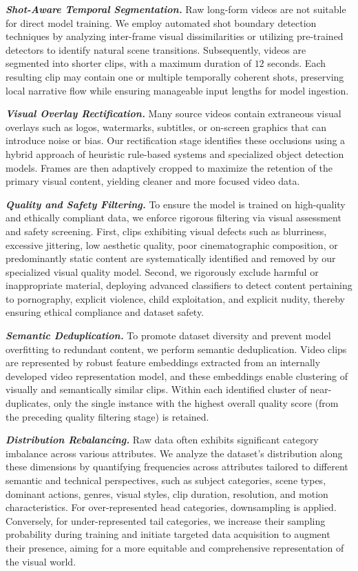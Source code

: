 \textbf{\textit{Shot-Aware Temporal Segmentation.}}  
Raw long-form videos are not suitable for direct model training. We employ automated shot boundary detection techniques by analyzing inter-frame visual dissimilarities or utilizing pre-trained detectors to identify natural scene transitions. Subsequently, videos are segmented into shorter clips, with a maximum duration of $12$ seconds. Each resulting clip may contain one or multiple temporally coherent shots, preserving local narrative flow while ensuring manageable input lengths for model ingestion.

\textbf{\textit{Visual Overlay Rectification.}}  
Many source videos contain extraneous visual overlays such as logos, watermarks, subtitles, or on-screen graphics that can introduce noise or bias. Our rectification stage identifies these occlusions using a hybrid approach of heuristic rule-based systems and specialized object detection models. Frames are then adaptively cropped to maximize the retention of the primary visual content, yielding cleaner and more focused video data.

\textbf{\textit{Quality and Safety Filtering.}}  
To ensure the model is trained on high-quality and ethically compliant data, we enforce rigorous filtering via visual assessment and safety screening. First, clips exhibiting visual defects such as blurriness, excessive jittering, low aesthetic quality, poor cinematographic composition, or predominantly static content are systematically identified and removed by our specialized visual quality model. 
Second, we rigorously exclude harmful or inappropriate material, deploying advanced classifiers to detect content pertaining to pornography, explicit violence, child exploitation, and explicit nudity, thereby ensuring ethical compliance and dataset safety.

\textbf{\textit{Semantic Deduplication.}}  
To promote dataset diversity and prevent model overfitting to redundant content, we perform semantic deduplication. Video clips are represented by robust feature embeddings extracted from an internally developed video representation model, and these embeddings enable clustering of visually and semantically similar clips. Within each identified cluster of near-duplicates, only the single instance with the highest overall quality score (from the preceding quality filtering stage) is retained.

\textbf{\textit{Distribution Rebalancing.}}  
Raw data often exhibits significant category imbalance across various attributes. We analyze the dataset’s distribution along these dimensions by quantifying frequencies across attributes tailored to different semantic and technical perspectives, such as subject categories, scene types, dominant actions, genres, visual styles, clip duration, resolution, and motion characteristics. For over-represented head categories, downsampling is applied. Conversely, for under-represented tail categories, we increase their sampling probability during training and initiate targeted data acquisition to augment their presence, aiming for a more equitable and comprehensive representation of the visual world.



